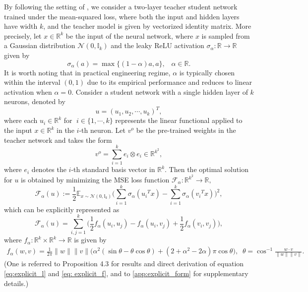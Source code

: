 \documentclass{amsart}%
\def\noi{\noindent}
\def\noi{\noindent}
\begin{document}
\noi By following the setting of \cite{ symmetry2021}, we consider a two-layer teacher student network trained under the mean-squared loss, where both the input and hidden layers have width $k$, and the teacher model is given by vectorized identity matrix. More precisely, let $x\in \mathbb{R}^k$ be the input of the neural network, where $x$ is sampled from a Gaussian distribution 
$\mathcal N(0,\mathbb I_k)$ and the leaky ReLU activation $\sigma_{\alpha}:\mathbb{R}\to\mathbb{R}$ given by 
\[
\sigma_{\alpha}(a)=\max\{(1-\alpha)a,a\},\;\;\;\alpha\in \mathbb R.
\] 
\noi It is worth noting that in practical engineering regime, $\alpha$ is typically chosen within the interval $(0,1)$ due to its empirical performance and reduces to linear activation when $\alpha=0$. \vskip0.3cm 
Consider a student network with a single hidden layer of $k$ neurons, denoted by
\[
u=(u_1,u_2,\cdots, u_k)^T,
\]
where each $u_i \in \mathbb{R}^k$ for $\;i\in \{1,\cdots,k\} $ represents the linear functional applied to the input $x\in \mathbb{R}^k$ in the $i$-th neuron. Let $v^o$ be the pre-trained weights in the teacher network %
and takes the form
\[
v^o = \sum_{i=1}^{k} e_i \otimes e_i \in \mathbb{R}^{k^2},
\]
where $e_i$ denotes the $i$-th standard basis vector in $\mathbb{R}^k$. Then the optimal solution for $u$ is obtained by minimizing the MSE loss function $\mathcal F_{\alpha}:\mathbb{R}^{k^2}\to \mathbb R,$
\begin{equation}\label{eq:Loss}
    \mathcal{F}_{\alpha}(u):=\frac{1}{2}\mathbb{E}_{x\sim \mathcal N(0,\mathbb{I}_k)}\Big(\sum_{i=1}^{k}\sigma_{\alpha}({u_i}^T x)-\sum_{i=1}^{ k}\sigma_{\alpha}({v_i}^T x) \Big)^2,
\end{equation}
which can be explicitly represented as
\begin{equation} \label{eq:explicit_l}
   \mathcal{F}_{\alpha}(u)=\sum_{i,j=1}^{k}\Big(\frac{1}{2}f_{\alpha}(u_i, u_j)-f_{\alpha}(u_i, v_j)+\frac{1}{2}f_{\alpha}(v_i,v_j)\Big),
\end{equation}
where $f_{\alpha}:\mathbb R^k\times \mathbb R^k \to \mathbb R$ is given by
    \begin{align} \label{eq: explicit_f}
        f_{\alpha}(w,v)=\frac{1}{2\pi}\|w\|\|v\|\Big(\alpha^2(\sin\theta-\theta\cos\theta)+(2+\alpha^2-2\alpha)\pi\cos\theta\Big), \;\; \theta=\cos^{-1}\frac
        {w\cdot v}{\|w\|\| v\|}.
    \end{align}
(One is referred to \cite{symmetry2021} Proposition 4.3 for results and direct derivation of equation \eqref{eq:explicit_l} and \eqref{eq: explicit_f}, and to \ref{app:explicit_form} for supplementary details.)\vskip0.3cm
\end{document}
